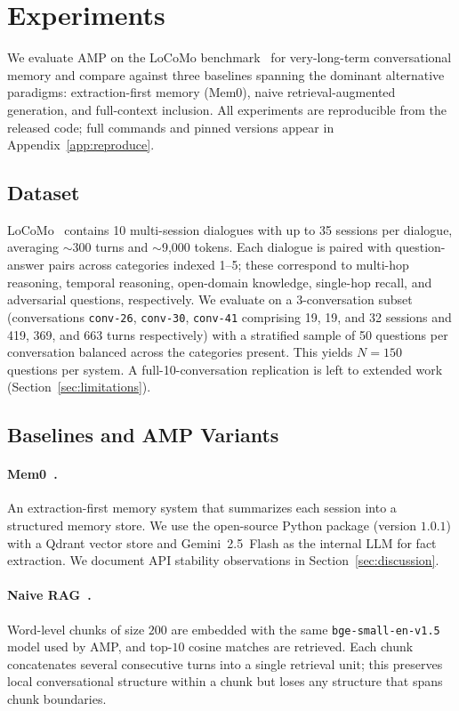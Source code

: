 \section{Experiments}
\label{sec:experiments}

We evaluate AMP on the LoCoMo benchmark~\citep{locomo} for very-long-term conversational memory and compare against three baselines spanning the dominant alternative paradigms: extraction-first memory (Mem0), naive retrieval-augmented generation, and full-context inclusion. All experiments are reproducible from the released code; full commands and pinned versions appear in Appendix~\ref{app:reproduce}.

\subsection{Dataset}
\label{sec:exp-data}

LoCoMo~\citep{locomo} contains 10 multi-session dialogues with up to 35 sessions per dialogue, averaging $\sim$300 turns and $\sim$9{,}000 tokens. Each dialogue is paired with question-answer pairs across categories indexed 1--5; these correspond to multi-hop reasoning, temporal reasoning, open-domain knowledge, single-hop recall, and adversarial questions, respectively. We evaluate on a 3-conversation subset (conversations \texttt{conv-26}, \texttt{conv-30}, \texttt{conv-41} comprising 19, 19, and 32 sessions and 419, 369, and 663 turns respectively) with a stratified sample of 50 questions per conversation balanced across the categories present. This yields $N = 150$ questions per system. A full-10-conversation replication is left to extended work (Section~\ref{sec:limitations}).

\subsection{Baselines and AMP Variants}
\label{sec:exp-baselines}

\paragraph{Mem0~\citep{mem0}.} An extraction-first memory system that summarizes each session into a structured memory store. We use the open-source Python package (version $1.0.1$) with a Qdrant vector store and Gemini~2.5~Flash as the internal LLM for fact extraction. We document API stability observations in Section~\ref{sec:discussion}.

\paragraph{Naive RAG~\citep{lewis2020rag}.} Word-level chunks of size $200$ are embedded with the same \texttt{bge-small-en-v1.5} model used by AMP, and top-$10$ cosine matches are retrieved. Each chunk concatenates several consecutive turns into a single retrieval unit; this preserves local conversational structure within a chunk but loses any structure that spans chunk boundaries.

